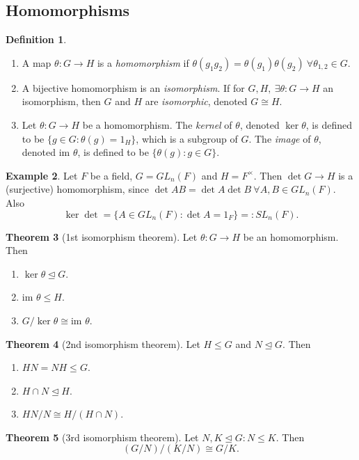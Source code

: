 \documentclass[a4paper]{article}
\newcommand{\im}{\text{im }}
\theoremstyle{definition}
\newtheorem{defn}{Definition}[subsection]
\newtheorem{thm}[defn]{Theorem}
\newtheorem{example}[defn]{Example}
\begin{document}
\subsection{Homomorphisms}
\begin{defn}
\begin{enumerate}
\item A map $\theta:G\rightarrow H$ is a \textit{homomorphism} if $\theta(g_1g_2)=\theta(g_1)\theta(g_2) \ \forall \theta_{1,2}\in G$.
\item A bijective homomorphism is an \textit{isomorphism}. If for $G,H,\ \exists\theta:G\rightarrow H$ an isomorphism, then $G$ and $H$ are \textit{isomorphic}, denoted $G\cong H$.
\item Let $\theta:G\rightarrow H$ be a homomorphism. The \textit{kernel} of $\theta$, denoted $\ker \theta$, is defined to be $\{g\in G:\theta (g)=1_H\}$, which is a subgroup of $G$. The \textit{image} of $\theta$, denoted $\im \theta$, is defined to be $\{\theta(g):g\in G\}$.
\end{enumerate}
\end{defn}
\begin{example}
Let $F$ be a field, $G=GL_n(F)$ and $H=F^\times$. Then $\det G\rightarrow H$ is a (surjective) homomorphism, since $\det AB=\det A\det B \ \forall A,B\in GL_n(F)$. Also
\[
\ker \det = \{A\in GL_n(F):\det A=1_F\}=: SL_n(F).
\]
\end{example}

\begin{thm}[1st isomorphism theorem]
Let $\theta:G\rightarrow H$ be an homomorphism. Then
\begin{enumerate}
\item $\ker\theta\unlhd G$.
\item $\im \theta\leq H$.
\item $G/\ker\theta\cong\im\theta$.
\end{enumerate}
\end{thm}

\begin{thm}[2nd isomorphism theorem]
Let $H\leq G$ and $N\unlhd G$. Then
\begin{enumerate}
\item $HN=NH\leq G$.
\item $H\cap N\unlhd H$.
\item $HN/N\cong H/(H\cap N)$.
\end{enumerate}
\end{thm}

\begin{thm}[3rd isomorphism theorem]
Let $N,K\unlhd G : N\leq K$. Then
\[
(G/N)/(K/N)\cong G/K.
\]
\end{thm}
\end{document}

